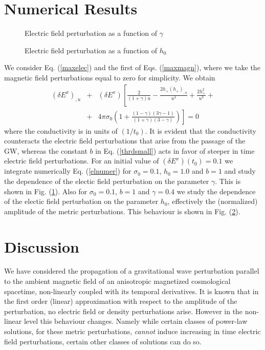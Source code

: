 \documentclass[prd,twocolumn,showpacs,preprintnumbers,amsmath,amssy mb]{revtex4}
\newcommand{\bea}{\begin{eqnarray}}
\newcommand{\eea}{\end{eqnarray}}
\newcommand{\nn}{\nonumber}
\begin{document}
\section{Numerical Results\label{NumRes}}

\begin{figure}
\resizebox{\hsize}{!}{\texttt{[image: fg1.ps]}}
\caption{Electric field perturbation as a function of $\gamma $}
\label{figur1}
\end{figure}

\begin{figure}
\resizebox{\hsize}{!}{\texttt{[image: fg2.ps]}}
\caption{Electric field perturbation as a function of $h_{0}$}
\label{figur2}
\end{figure}

We consider Eq. (\ref{maxelec}) and the first of 
Eqs. (\ref{maxmagn}), where we take the magnetic field 
perturbations equal to zero for simplicity. We obtain 
\bea 
\label{elnumer}
(\delta E^{x})_{,u}&+&(\delta E^{x})
\left[\frac{2}{(1+\gamma )u}-\frac{2h_{+}(h_{+})_{,u}}{u^{2}}\right.
+\frac{2h_{+}^{2}}{u^{3}}+\nn \\&+&
4\pi \sigma _{0}
\left.\left(1+\frac{(1-\gamma )(3\gamma -1)}{(1+\gamma )(3-\gamma )}\right)\right]
=0
\eea
where the conductivity is in units of $(1/t_{0})$. It is evident that 
the conductivity counteracts the electric field perturbations 
that arise from the passage of the GW, whereas the constant $b$ in 
Eq. (\ref{thrdsmall}) acts in favor of steeper in time electric field 
perturbations. For an initial value of $(\delta E^{x})(t_{0})=0.1$ 
we integrate numerically Eq. (\ref{elnumer}) for $\sigma _{0}=0.1$, 
$h_{0}=1.0$ and $b=1$ and study the dependence of the electic field 
perturbation on the parameter $\gamma $. This is shown in 
Fig. (\ref{figur1}). Also for $\sigma _{0}=0.1$, $b=1$ and $\gamma =0.4$ 
we study the dependence of the electic field perturbation on the parameter 
$h_{0}$, effectively the (normalized) amplitude of the metric 
perturbations. This behaviour is shown in Fig. (\ref{figur2}). 


\section{Discussion}

We have considered the propagation of a gravitational 
wave perturbation parallel to the ambient magnetic field of an  
anisotropic magnetized cosmological 
spacetime, non-linearly coupled with its temporal derivatives. It 
is known that in the first order (linear) approximation 
with respect to the amplitude of the perturbation, no 
electric field or density perturbations arise. However in 
the non-linear level this behaviour changes. Namely while 
certain classes of power-law solutions, for these metric 
perturbations, {\it cannot} 
induce increasing in time electric field perturbations, certain 
other classes of solutions can do so. 
\end{document}
